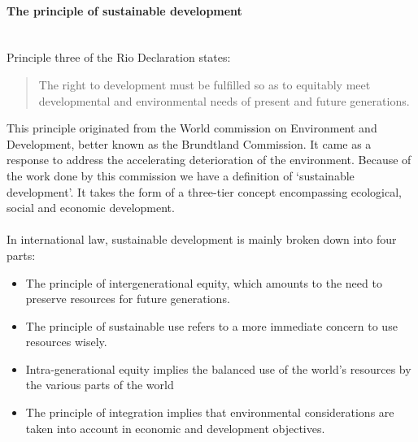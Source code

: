 \documentclass[../summary.tex]{subfiles}
\begin{document}
			\paragraph{The principle of sustainable development}\mbox{}\\
				\label{par:13-princ-sus-dev}
				Principle three of the Rio Declaration states:
				\begin{quote}
					The right to development must be fulfilled so as to equitably meet developmental and environmental needs of present and future generations. 
				\end{quote}
				This principle originated from the World commission on Environment and Development, better known as the Brundtland Commission. It came as a response to address the accelerating deterioration of the environment. Because of the work done by this commission we have a definition of `sustainable development'. It takes the form of a three-tier concept encompassing ecological, social and economic development.\\
				\\
				In international law, sustainable development is mainly broken down into four parts:
				\begin{itemize}
					\item The principle of intergenerational equity, which amounts to the need to preserve resources for future generations. 
					\item The principle of sustainable use refers to a more immediate concern to use resources wisely.
					\item Intra-generational equity implies the balanced use of the world's resources by the various parts of the world
					\item The principle of integration implies that environmental considerations are taken into account in economic and development objectives. 
				\end{itemize}
				
\end{document}

